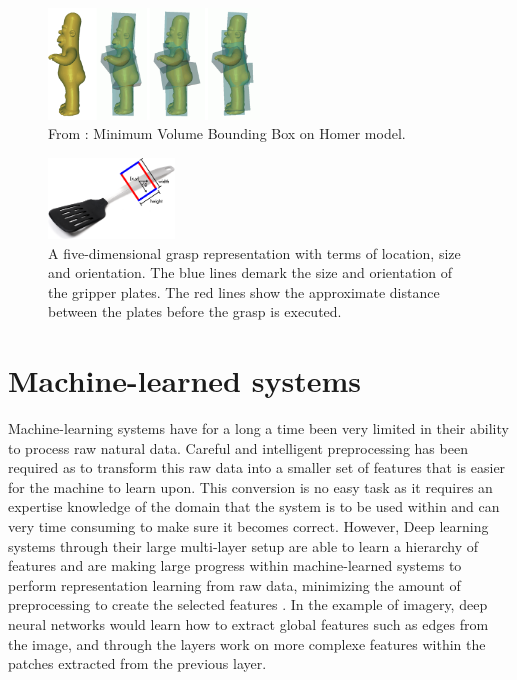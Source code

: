 \begin{figure}
	\centering
	\includegraphics[width=0.5\textwidth]{img/related-work/mvbb.png}
	\caption{From \parencite{Huebner2008}: Minimum Volume Bounding Box on Homer model.}
	\label{fig:rel__mvbb}
\end{figure}

\begin{figure}
	\centering
	\includegraphics[width=0.3\textwidth]{img/related-work/grasp-representation.png}
	\caption{A five-dimensional grasp representation with terms of location, size and orientation. The blue lines demark the size and orientation of the gripper plates. The red lines show the approximate distance between the plates before the grasp is executed.}
	\label{fig:grasp-representation}
\end{figure}


\section{Machine-learned systems}
\label{sec:machine_learned_systems}
Machine-learning systems have for a long a time been very limited in their ability to process raw natural data. Careful and intelligent preprocessing has been required as to transform this raw data into a smaller set of features that is easier for the machine to learn upon. This conversion is no easy task as it requires an expertise knowledge of the domain that the system is to be used within and can very time consuming to make sure it becomes correct. However, Deep learning systems through their large multi-layer setup are able to learn a hierarchy of features and are making large progress within machine-learned systems to perform representation learning from raw data, minimizing the amount of preprocessing to create the selected features \parencite{Lecun2015}. In the example of imagery, deep neural networks would learn how to extract global features such as edges from the image, and through the layers work on more complexe features within the patches extracted from the previous layer.

